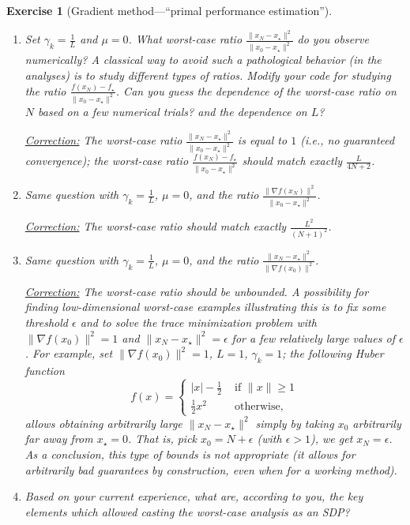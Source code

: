 \documentclass[11pt,a4paper]{article}
\newcommand{\correction}[1]{{{\color{blue}\underline{Correction:} #1}}}
\newcommand{\correction}[1]{}
\newtheorem{exercise}{Exercise}
\begin{document}
\begin{exercise}[Gradient method---``primal performance estimation'']
\begin{enumerate}
	\item Set $\gamma_k=\tfrac{1}{L}$ and $\mu=0$. What worst-case ratio $\frac{\|x_{N}-x_\star\|^2}{\|x_0-x_\star\|^2}$ do you observe numerically? A classical way to avoid such a pathological behavior  (in the analyses) is to study different types of ratios. Modify your code for studying the ratio $\frac{f(x_N)-f_\star}{\|x_0-x_\star\|^2}$. Can you guess the dependence of the worst-case ratio on $N$ based on a few numerical trials? and the dependence on $L$?
	
	\correction{The worst-case ratio $\frac{\|x_{N}-x_\star\|^2}{\|x_0-x_\star\|^2}$ is equal to $1$ (i.e., no guaranteed convergence); the worst-case ratio $\frac{f(x_N)-f_\star}{\|x_0-x_\star\|^2}$ should match exactly $\frac{L}{4N+2}$.}
	
	
	\item Same question with $\gamma_k=\tfrac{1}{L}$, $\mu=0$, and the ratio $\frac{\|\nabla f(x_N)\|^2}{\|x_0-x_\star\|^2}$.
	
	\correction{The worst-case ratio should match exactly $\frac{L^2}{(N+1)^2}$.}
	
	\item Same question with $\gamma_k=\tfrac{1}{L}$, $\mu=0$, and the ratio $\frac{\|x_N-x_\star\|^2}{\|\nabla f(x_0)\|^2}$.
	
	\correction{The worst-case ratio should be unbounded. A possibility for finding low-dimensional worst-case examples illustrating this is to fix some threshold $\epsilon$ and to solve the trace minimization problem with $\|\nabla f(x_0)\|^2=1$ and $\|x_N-x_\star\|^2=\epsilon$ for a few relatively large values of $\epsilon$. For example, set $\|\nabla f(x_0)\|^2=1$, $L=1$, $\gamma_k=1$; the following Huber function
\begin{equation}
f(x)=\left\{\begin{array}{ll}
|x| - \tfrac{1}{2} & \text{ if } \|x\|\geqslant 1\\
\tfrac{1}{2}x^2 & \text{ otherwise, }
\end{array}\right.
\end{equation}	
allows obtaining arbitrarily large $\|x_N-x_\star\|^2$ simply by taking $x_0$ arbitrarily far away from $x_\star=0$. That is, pick $x_0=N+\epsilon$ (with $\epsilon>1$), we get $x_N=\epsilon$. As a conclusion, this type of bounds is not appropriate (it allows for arbitrarily bad guarantees by construction, even when for a working method).}
	
	\item Based on your current experience, what are, according to you, the key elements which allowed casting the worst-case analysis as an SDP?
	

\end{enumerate}
\end{exercise}
\end{document}
